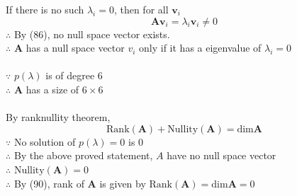 \documentclass[12pt]{article}
\newcommand{\matr}[1]{\bm{#1}}
\begin{document}
If there is no such $\lambda_i=0$, then for all $\matr v_i$
\begin{equation}
	\matr A \matr v_i = \lambda_i \matr v _i \neq 0
\end{equation}
$\therefore$ By (86), no null space vector exists. \\
$\therefore$ $\matr A$ has a null space vector $v_i$ only if it has a eigenvalue of $\lambda _i=0$ \\\\
$\because$ $p(\lambda)$ is of degree 6 \\
$\therefore$ $\matr A$ has a size of $6\times 6$ \\ \\
By rank\textendash nullity theorem,
\begin{equation}
    \textrm{Rank}(\matr A) + \textrm{Nullity}(\matr A) = \textrm{dim} \matr A
\end{equation}
$\because$ No solution of $p(\lambda)=0$ is 0 \\
$\therefore$ By the above proved statement, $A$ have no null space vector \\
$\therefore$ $\textrm{Nullity}(\matr A)=0$ \\
$\therefore$ By (90), rank of $\matr A$ is given by $\textrm{Rank}(\matr A) = \textrm{dim} \matr A = 0$
\end{document}
